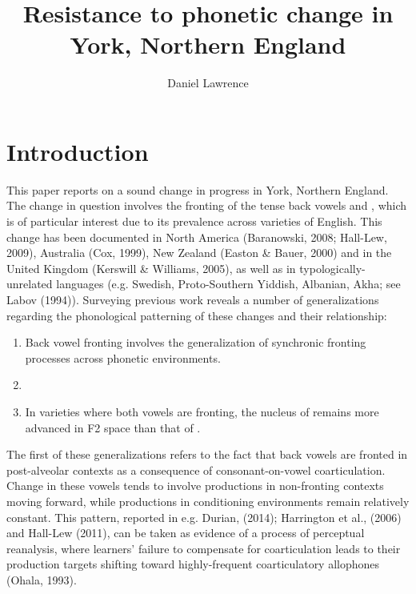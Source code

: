 \documentclass[12pt]{article}
\title{Resistance to phonetic change in York, Northern England}
\author{Daniel Lawrence}
\begin{document}
\maketitle

\section{Introduction}
This paper reports on a sound change in progress in York, Northern England. The change in question involves the fronting of the tense back vowels  and , which is of particular interest due to its prevalence across varieties of English. This change has been documented in North America (Baranowski, 2008; Hall-Lew, 2009), Australia (Cox, 1999), New Zealand (Easton \& Bauer, 2000) and in the United Kingdom (Kerswill \& Williams, 2005), as well as in typologically-unrelated languages (e.g. Swedish, Proto-Southern Yiddish, Albanian, Akha; see Labov (1994)). Surveying previous work reveals a number of generalizations regarding the phonological patterning of these changes and their relationship:


\begin{enumerate}
\item{Back vowel fronting involves the generalization of synchronic fronting processes across phonetic environments.}
\item{}
\item{In varieties where both vowels are fronting, the nucleus of  remains more advanced in F2 space than that of .}
\end{enumerate}

The first of these generalizations refers to the fact that back vowels are fronted in post-alveolar contexts as a consequence of consonant-on-vowel coarticulation. Change in these vowels tends to involve productions in non-fronting contexts moving forward, while productions in conditioning environments remain relatively constant. This pattern, reported in e.g. Durian, (2014); Harrington et al., (2006) and Hall-Lew (2011), can be taken as evidence of a process of perceptual reanalysis, where learners' failure to compensate for coarticulation leads to their production targets shifting toward highly-frequent coarticulatory allophones (Ohala, 1993). 
\end{document}
